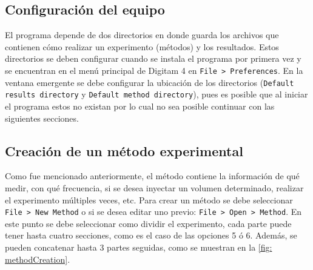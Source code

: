 	\subsection{Configuración del equipo}
	El programa depende de dos directorios en donde guarda los archivos que contienen c\'omo realizar un experimento (m\'etodos) y los resultados. Estos directorios se deben configurar cuando se instala el programa por primera vez y se encuentran en el men\'u principal de Digitam 4 en \texttt{File > Preferences}. En la ventana emergente se debe configurar la ubicaci\'on de los directorios (\texttt{Default results directory} y \texttt{Default method directory}), pues es posible que al iniciar el programa estos no existan por lo cual no sea posible continuar con las siguientes secciones.
	
	\subsection{Creación de un método experimental}
	Como fue mencionado anteriormente, el m\'etodo contiene la informaci\'on de qu\'e medir, con qu\'e frecuencia, si se desea inyectar un volumen determinado, realizar el experimento m\'ultiples veces, etc. Para crear un m\'etodo se debe seleccionar \texttt{File > New Method} o si se desea editar uno previo: \texttt{File > Open > Method}. En este punto se debe seleccionar como dividir el experimento, cada parte puede tener hasta cuatro secciones, como es el caso de las opciones 5 \'o 6. Adem\'as, se pueden concatenar hasta 3 partes seguidas, como se muestran en la \autoref{fig: methodCreation}.
	

